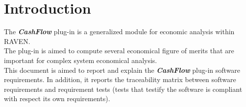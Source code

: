 \section{Introduction}
The \textbf{\textit{CashFlow}} plug-in is a generalized module for economic analysis within RAVEN.
\\The plug-in is aimed to compute several economical figure of merits that are important for complex
system economical analysis.
\\This document is aimed to report and explain the  \textbf{\textit{CashFlow}} plug-in software requirements. In addition, it reports the traceability matrix between software requirements and requirement tests (tests that testify the software is compliant
with respect its own requirements).
